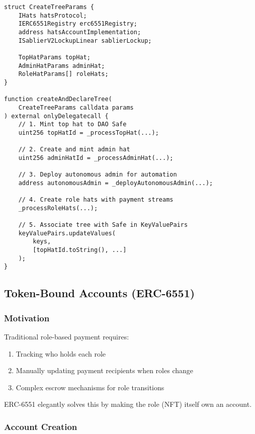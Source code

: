 \documentclass[11pt,a4paper]{article}
\begin{document}
\begin{lstlisting}[caption=Creating a Hats Tree]
struct CreateTreeParams {
    IHats hatsProtocol;
    IERC6551Registry erc6551Registry;
    address hatsAccountImplementation;
    ISablierV2LockupLinear sablierLockup;

    TopHatParams topHat;
    AdminHatParams adminHat;
    RoleHatParams[] roleHats;
}

function createAndDeclareTree(
    CreateTreeParams calldata params
) external onlyDelegatecall {
    // 1. Mint top hat to DAO Safe
    uint256 topHatId = _processTopHat(...);

    // 2. Create and mint admin hat
    uint256 adminHatId = _processAdminHat(...);

    // 3. Deploy autonomous admin for automation
    address autonomousAdmin = _deployAutonomousAdmin(...);

    // 4. Create role hats with payment streams
    _processRoleHats(...);

    // 5. Associate tree with Safe in KeyValuePairs
    keyValuePairs.updateValues(
        keys,
        [topHatId.toString(), ...]
    );
}
\end{lstlisting}

\subsection{Token-Bound Accounts (ERC-6551)}

\subsubsection{Motivation}

Traditional role-based payment requires:
\begin{enumerate}
    \item Tracking who holds each role
    \item Manually updating payment recipients when roles change
    \item Complex escrow mechanisms for role transitions
\end{enumerate}

ERC-6551 elegantly solves this by making the role (NFT) itself own an account.

\subsubsection{Account Creation}
\end{document}
